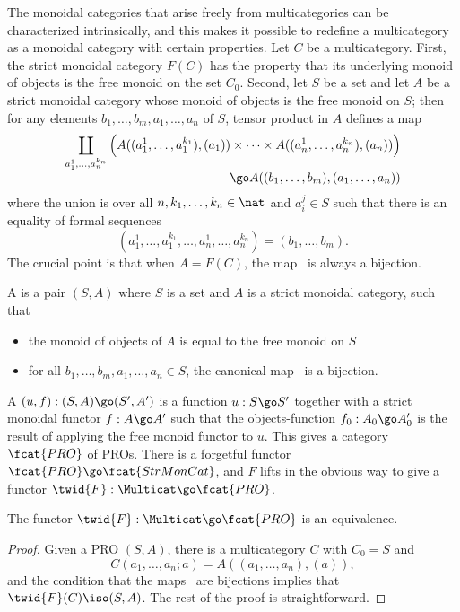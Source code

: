 The monoidal categories that arise freely from multicategories can be
characterized intrinsically, and this makes it possible to redefine a
multicategory as a monoidal category with certain properties.  Let $C$ be a
multicategory.  First, the strict monoidal category $F(C)$ has the property
that its underlying monoid of objects is the free monoid on the set $C_0$.
Second, let $S$ be a set and let $A$ be a strict monoidal category whose
monoid of objects is the free monoid on $S$; then for any elements $b_1,
\ldots, b_m, a_1, \ldots, a_n$ of $S$, tensor product in $A$ defines a map
%
\begin{equation}	\label{eq:PRO-map}
\begin{array}{r}\displaystyle
\displaystyle\coprod_{a_1^1, \ldots, a_n^{k_n}}
\left(
A((a_1^1, \ldots, a_1^{k_1}), (a_1))
\times\cdots\times
A((a_n^1, \ldots, a_n^{k_n}), (a_n))
\right)
\\
\go
A((b_1, \ldots, b_m), (a_1, \ldots, a_n))
\end{array}
\end{equation}
%
where the union is over all $n, k_1, \ldots, k_n \in\nat$ and $a_i^j \in S$
such that there is an equality of formal sequences
\[
(a_1^1, \ldots, a_1^{k_1}, \ldots, a_n^1, \ldots, a_n^{k_n})
=
(b_1, \ldots, b_m).
\]
The crucial point is that when $A=F(C)$, the map~ is
always a bijection.

A %
%
%
is a pair $(S,A)$ where $S$ is a set and $A$ is a strict
monoidal category, such that
%
\begin{itemize}
\item the monoid of objects of $A$ is equal to the free monoid on $S$
\item for all $b_1, \ldots, b_m, a_1, \ldots, a_n \in S$, the canonical
  map~ is a bijection.
\end{itemize}
%
A  $(u,f): (S, A) \go (S', A')$ is a function $u: S \go
S'$ together with a strict monoidal functor $f: A \go A'$ such that the
objects-function $f_0: A_0 \go A'_0$ is the result of applying the free
monoid functor to $u$.  This gives a category $\fcat{PRO}$ of PROs.  There
is a forgetful functor $\fcat{PRO} \go \fcat{StrMonCat}$, and $F$ lifts in
the obvious way to give a functor $\twid{F}: \Multicat \go \fcat{PRO}$.
%
\begin{propn}
The functor $\twid{F}: \Multicat \go \fcat{PRO}$ is an equivalence.
\end{propn}
%
\begin{proof}
Given a PRO $(S,A)$, there is a multicategory $C$ with $C_0 = S$ and
\[
C(a_1, \ldots, a_n; a) = 
A((a_1, \ldots, a_n), (a)),
\]
and the condition that the maps~ are bijections implies
that $\twid{F}(C) \iso (S,A)$.  The rest of the proof is straightforward.
\done
\end{proof}

